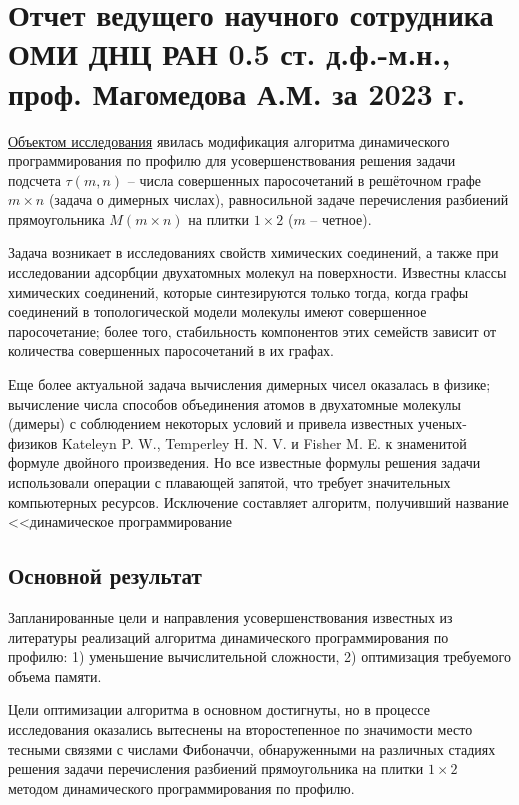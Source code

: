 \chapter{Отчет ведущего научного сотрудника ОМИ ДНЦ РАН 0.5 ст. д.ф.-м.н., проф. Магомедова А.М. за 2023 г.}

\underline{Объектом исследования}
явилась модификация алгоритма динамического программирования по профилю для усовершенствования решения задачи подсчета  $\tau(m, n)$ -- числа совершенных паросочетаний в решёточном графе $m\times n$ (задача о димерных числах),  равносильной задаче  перечисления разбиений прямоугольника $M(m\times n)$ на плитки $1\times 2$ ($m$ -- четное). 

Задача возникает в исследованиях свойств химических соединений, а также при исследовании адсорбции двухатомных молекул на поверхности. 
Известны классы химических соединений, которые синтезируются только тогда, когда графы соединений в топологической модели молекулы имеют совершенное паросочетание; более того, стабильность компонентов этих семейств зависит от количества совершенных паросочетаний в их графах.

Еще более актуальной задача вычисления димерных чисел оказалась в физике; вычисление числа способов объединения атомов в двухатомные молекулы (димеры) с соблюдением некоторых условий и привела известных ученых-физиков Kateleyn P. W., Temperley H. N. V. и Fisher M. E. к знаменитой формуле двойного произведения. Но все известные формулы решения задачи использовали операции с плавающей запятой, что требует значительных компьютерных ресурсов.
Исключение составляет алгоритм, получивший название <<динамическое программирование

\section{Основной результат}

Запланированные цели и направления усовершенствования известных из литературы реализаций алгоритма динамического программирования по профилю: 1) уменьшение вычислительной сложности, 2) оптимизация требуемого объема памяти.

Цели оптимизации алгоритма в основном достигнуты, но в процессе исследования оказались вытеснены на второстепенное по значимости место тесными связями с числами Фибоначчи, обнаруженными на различных стадиях решения задачи перечисления разбиений прямоугольника на плитки $1\times 2$ методом динамического программирования по профилю.

